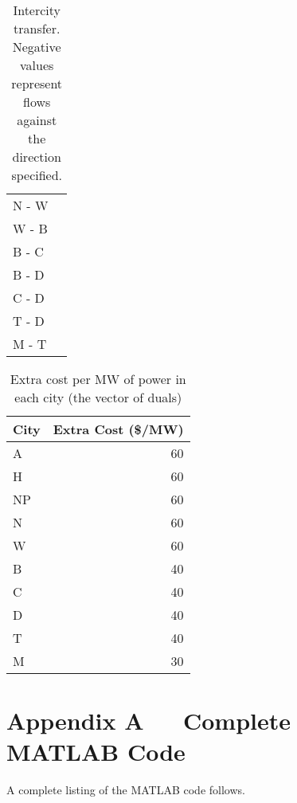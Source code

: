 \documentclass[11pt]{article}
\begin{document}
\begin{table}[h]
\begin{minipage}{0.5\linewidth}
\begin{tabular}{@{}lr@{}}
		N - W       & \color{red}{$-175.25$}       \\ %
		W - B       & \color{red}{$-1000$}          \\ %
		B - C       & \color{ForestGreen}{$292.2$}  \\ %
		B - D       & \color{red}{$-22.2$}          \\ %
		C - D       & \color{red}{$-785.8$}         \\ %
		T - D       & \color{ForestGreen}{$233$}    \\ %
		M - T       & \color{ForestGreen}{$850$}    \\ \bottomrule
		\end{tabular}
		\caption{Intercity transfer. Negative values represent flows against the direction specified.}
	\end{minipage}
\end{table}

\begin{table}[h]
	\centering
	\begin{tabular}{@{}lr@{}}
	\toprule
	City & Extra Cost (\$/MW) \\ \midrule
	A       & 60              \\
	H       & 60              \\
	NP      & 60              \\
	N       & 60              \\
	W       & 60              \\
	B       & 40              \\
	C       & 40              \\
	D       & 40              \\
	T       & 40              \\
	M       & 30              \\ \bottomrule
	\end{tabular}
	\caption{Extra cost per MW of power in each city (the vector of duals)}
\end{table}

\newpage\phantom{hi marker :)}

\newpage
\section*{Appendix A $\quad$ Complete MATLAB Code}
A complete listing of the MATLAB code follows. 

\inputminted{matlab}{main.m}
\end{document}
